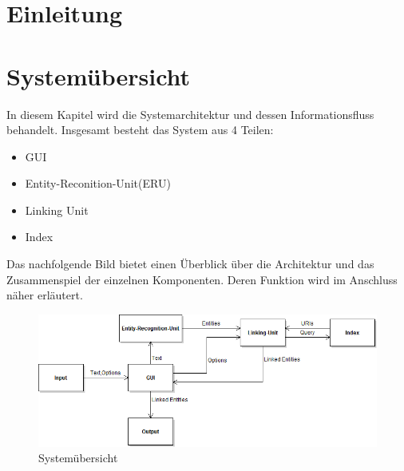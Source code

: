 \documentclass[11pt, a4paper, oneside]{Thesis} %
\begin{document}
\chapter{Einleitung}
\label{Kapitel 1}

\chapter{System\"ubersicht}
\label{Kapitel 2}

In diesem Kapitel wird die Systemarchitektur und dessen Informationsfluss behandelt. Insgesamt besteht das System aus 4 Teilen:
\begin{itemize}
\item GUI
\item Entity-Reconition-Unit(ERU)
\item Linking Unit
\item Index
\end{itemize}
Das nachfolgende Bild bietet einen \"Uberblick \"uber die Architektur und das Zusammenspiel der einzelnen Komponenten. Deren Funktion wird im Anschluss n\"aher erl\"autert.
\begin{figure}[ht]
\centering
\includegraphics[scale=0.55]{./system.png}
\caption[System\"ubersicht]{System\"ubersicht}
\end{figure}
\end{document}
